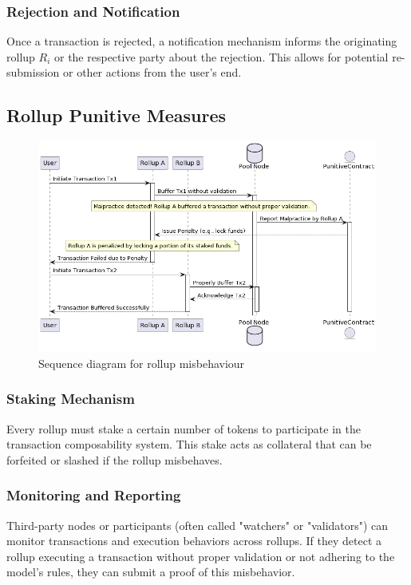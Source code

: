 \documentclass{article}
\begin{document}
\subsubsection{Rejection and Notification}
Once a transaction is rejected, a notification mechanism informs the originating rollup \( R_i \) or the respective party about the rejection. This allows for potential re-submission or other actions from the user’s end.

\subsection{Rollup Punitive Measures}

\begin{figure}[h]
  \centering
  \includegraphics[scale=0.5]{diagram2}
  \caption{Sequence diagram for rollup misbehaviour}
\end{figure}

\subsubsection{Staking Mechanism}
Every rollup must stake a certain number of tokens to participate in the transaction composability system. This stake acts as collateral that can be forfeited or slashed if the rollup misbehaves.

\subsubsection{Monitoring and Reporting}
Third-party nodes or participants (often called "watchers" or "validators") can monitor transactions and execution behaviors across rollups. If they detect a rollup executing a transaction without proper validation or not adhering to the model's rules, they can submit a proof of this misbehavior.
\end{document}
